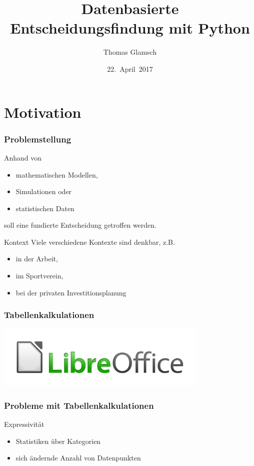 \documentclass{beamer}
\title{Datenbasierte Entscheidungsfindung mit Python}
\author{Thomas Glamsch}
\date{22.~April~2017}
\begin{document}
\begin{frame}
  \titlepage
\end{frame}

\section{Motivation}

\begin{frame}
  \frametitle{Problemstellung}
  Anhand von
  \begin{itemize}
  \item mathematischen Modellen,
  \item Simulationen oder
  \item statistischen Daten
  \end{itemize}
  soll eine fundierte Entscheidung getroffen werden.

  \pause

  \begin{block}{Kontext}
    Viele verschiedene Kontexte sind denkbar, z.B.
    \begin{itemize}
    \item in der Arbeit,
    \item im Sportverein,
    \item bei der privaten Investitionsplanung
    \end{itemize}
  \end{block}
\end{frame}

\begin{frame}
  \frametitle{Tabellenkalkulationen}
  \includegraphics[width=4in]{libreoffice-logo.png}
\end{frame}

\begin{frame}
  \frametitle{Probleme mit Tabellenkalkulationen}
  \begin{block}{Expressivit\"at}
    \begin{itemize}
    \item Statistiken \"uber Kategorien
    \item sich \"andernde Anzahl von Datenpunkten
    \end{itemize}
  \end{block}
\end{frame}
\end{document}
